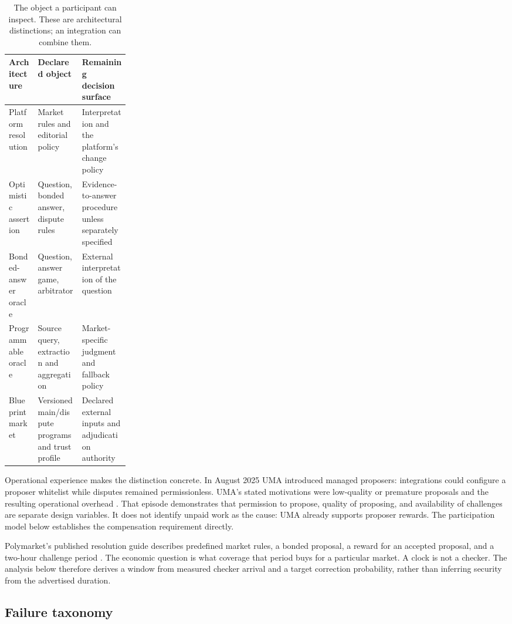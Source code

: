 \documentclass[10pt]{article}
\begin{document}
\begin{table}[t]
\centering
\caption{The object a participant can inspect. These are architectural distinctions; an integration can combine them.}
\label{tab:creation_commitment}
\small
\begin{tabularx}{\linewidth}{@{}p{0.24\linewidth}YY@{}}
\toprule
Architecture & Declared object & Remaining decision surface \\
\midrule
Platform resolution & Market rules and editorial policy & Interpretation and the platform's change policy \\
Optimistic assertion & Question, bonded answer, dispute rules & Evidence-to-answer procedure unless separately specified \\
Bonded-answer oracle & Question, answer game, arbitrator & External interpretation of the question \\
Programmable oracle & Source query, extraction and aggregation & Market-specific judgment and fallback policy \\
Blueprint market & Versioned main/dispute programs and trust profile & Declared external inputs and adjudication authority \\
\bottomrule
\end{tabularx}
\end{table}

Operational experience makes the distinction concrete. In August 2025 UMA introduced managed proposers: integrations could configure a proposer whitelist while disputes remained permissionless. UMA's stated motivations were low-quality or premature proposals and the resulting operational overhead \cite{umamoop2025}. That episode demonstrates that permission to propose, quality of proposing, and availability of challenges are separate design variables. It does not identify unpaid work as the cause: UMA already supports proposer rewards. The participation model below establishes the compensation requirement directly.

Polymarket's published resolution guide describes predefined market rules, a bonded proposal, a reward for an accepted proposal, and a two-hour challenge period \cite{polymarket2024}. The economic question is what coverage that period buys for a particular market. A clock is not a checker. The analysis below therefore derives a window from measured checker arrival and a target correction probability, rather than inferring security from the advertised duration.

\subsection{Failure taxonomy}
\label{sec:failures}
\end{document}
